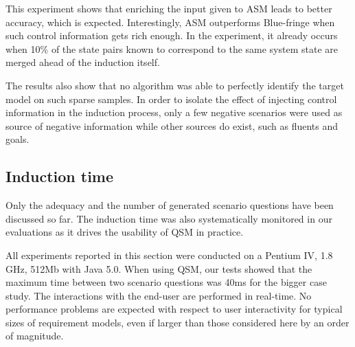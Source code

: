 This experiment shows that enriching the input given to ASM leads to better accuracy, which is expected. Interestingly, ASM outperforms Blue-fringe when such control information gets rich enough. In the experiment, it already occurs when 10\% of the state pairs known to correspond to the same system state are merged ahead of the induction itself.

The results also show that no algorithm was able to perfectly identify the target model on such sparse samples. In order to isolate the effect of injecting control information in the induction process, only a few negative scenarios were used as source of negative information while other sources do exist, such as fluents and goals.


\subsection{Induction time}

Only the adequacy and the number of generated scenario questions have been discussed so far. The induction time was also systematically monitored in our evaluations as it drives the usability of QSM in practice. 

All experiments reported in this section were conducted on a Pentium IV, 1.8 GHz, 512Mb with Java 5.0. When using QSM, our tests showed that the maximum time between two scenario questions was 40ms for the bigger case study. The interactions with the end-user are performed in real-time. No performance problems are expected with respect to user interactivity for typical sizes of requirement models, even if larger than those considered here by an order of magnitude.

